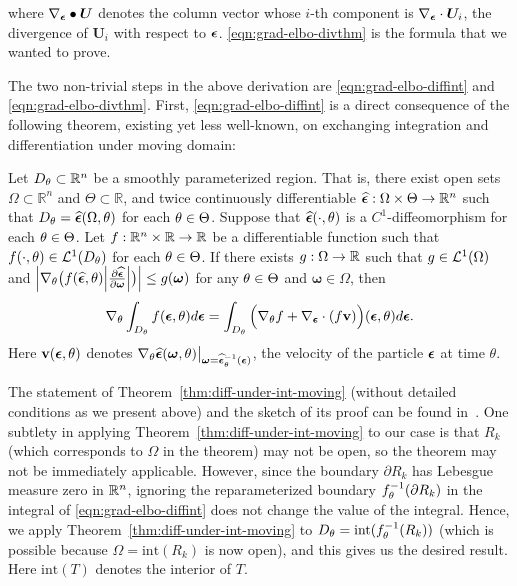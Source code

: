 where $\nabla_{\bm{\epsilon}} \bullet \bm{U}$ denotes the column vector
whose $i$-th component is $\nabla_{\bm{\epsilon}} \cdot \bm{U}_i$,
the divergence of $\bm{U}_i$ with respect to $\bm{\epsilon}$.
\eqref{eqn:grad-elbo-divthm} is the formula that we wanted to prove.

The two non-trivial steps in the above derivation are
\eqref{eqn:grad-elbo-diffint} and \eqref{eqn:grad-elbo-divthm}.
First, \eqref{eqn:grad-elbo-diffint} is a direct consequence of
the following theorem, existing yet less well-known, on exchanging integration and differentiation
under moving domain:
\begin{theorem}
  \label{thm:diff-under-int-moving}
  Let $D_\theta \subset \mathbb{R}^n$ be a smoothly parameterized region.
  That is, there exist open sets $\Omega \subset \mathbb{R}^n$ and $\Theta \subset \mathbb{R}$,
  and twice continuously differentiable
  $\widehat{\bm{\epsilon}}: \Omega \times \Theta \rightarrow \mathbb{R}^n$
  such that $D_\theta = \widehat{\bm{\epsilon}}(\Omega, \theta)$ for each $\theta \in \Theta$.
  Suppose that $\widehat{\bm{\epsilon}}(\cdot, \theta)$ is a $C^1$-diffeomorphism for each $\theta \in \Theta$.
  Let $f : \mathbb{R}^n \times \mathbb{R} \to \mathbb{R}$ be a differentiable function
  such that $f(\cdot,\theta) \in \mathcal{L}^1({D_\theta})$ for each $\theta \in \Theta$.
  If there exists   $g : \Omega \to \mathbb{R}$
  such that $g \in \mathcal{L}^1({\Omega})$ and
  $\abs{\nabla_{\theta}\big(f(\widehat{\bm{\epsilon}},\theta)
    \abs{\pdv{\widehat{\bm{\epsilon}}}{\bm \omega}} \big)}
  \leq g(\bm{\omega})$
  for any $\theta \in \Theta$ and $\bm{\omega} \in \Omega$,
  then
  $$
  \nabla_{\theta} \int_{D_{\theta}}f(\bm{\epsilon},\theta) d \bm{\epsilon}
  =
  \int_{D_\theta}  \Big(\nabla_{\theta} f + \nabla_{\bm{\epsilon}} \cdot (f\bm{\mathrm{v}})\Big)(\bm{\epsilon},\theta)
  d \bm{\epsilon}.
  $$
  Here $\bm{\mathrm{v}}(\bm{\epsilon}, \theta)$ denotes
  $\nabla_{\theta} \widehat{\bm{\epsilon}}(\bm{\omega},\theta)
  \big|_{{\bm{\omega}=\widehat{\bm{\epsilon}}^{-1}_\theta(\bm{\epsilon})}}$,
  the velocity of the particle $\bm{\epsilon}$ at time $\theta$.
\end{theorem}
The statement of Theorem~\ref{thm:diff-under-int-moving}
(without detailed conditions as we present above)
and the sketch of its proof
can be found in~\cite{FlandersAMM1973}.
One subtlety in applying Theorem~\ref{thm:diff-under-int-moving} to our case
is that $R_k$ (which corresponds to $\Omega$ in the theorem) may not be open,
so the theorem may not be immediately applicable.
However, since the boundary $\partial R_k$ has Lebesgue measure zero in $\mathbb{R}^n$,
ignoring the reparameterized boundary $f_\theta^{-1}(\partial R_k)$
in the integral of \eqref{eqn:grad-elbo-diffint} does not change the value of the integral.
Hence, we apply Theorem~\ref{thm:diff-under-int-moving} to
$D_\theta = \mathrm{int}(f_\theta^{-1}(R_k))$
(which is possible because $\Omega = \mathrm{int}(R_k)$ is now open),
and this gives us the desired result.
Here $\mathrm{int}(T)$ denotes the interior of $T$.


